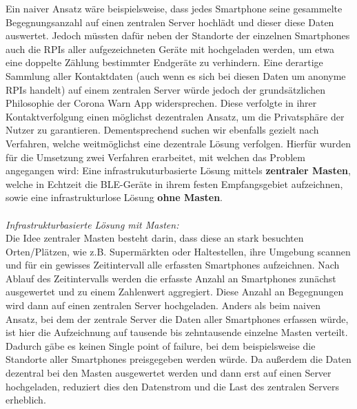 \documentclass[conference,compsoc]{IEEEtran}
\begin{document}
Ein naiver Ansatz wäre beispielsweise, dass jedes Smartphone seine gesammelte Begegnungsanzahl auf einen zentralen Server hochlädt und dieser diese Daten auswertet. 
Jedoch müssten dafür neben der Standorte der einzelnen Smartphones auch die RPIs aller aufgezeichneten Geräte mit hochgeladen werden, um etwa eine doppelte Zählung bestimmter Endgeräte zu verhindern. 
Eine derartige Sammlung aller Kontaktdaten (auch wenn es sich bei diesen Daten um anonyme RPIs handelt) auf einem zentralen Server würde jedoch der grundsätzlichen Philosophie der Corona Warn App widersprechen.
Diese verfolgte in ihrer Kontaktverfolgung einen möglichst dezentralen Ansatz, um die Privatsphäre der Nutzer zu garantieren.
Dementsprechend suchen wir ebenfalls gezielt nach Verfahren, welche weitmöglichst eine dezentrale Lösung verfolgen.
Hierfür wurden für die Umsetzung zwei Verfahren erarbeitet, mit welchen das Problem angegangen wird: Eine infrastrukuturbasierte Lösung mittels \textbf{zentraler Masten}, welche in Echtzeit die BLE-Geräte in ihrem festen Empfangsgebiet aufzeichnen, sowie eine infrastrukturlose Lösung \textbf{ohne Masten}. \\ \\
\textit{Infrastrukturbasierte Lösung mit Masten: }\\
Die Idee zentraler Masten besteht darin, dass diese an stark besuchten Orten/Plätzen, wie z.B. Supermärkten oder Haltestellen, ihre Umgebung scannen und für ein gewisses Zeitintervall alle erfassten Smartphones aufzeichnen. 
Nach Ablauf des Zeitintervalls werden die erfasste Anzahl an Smartphones zunächst ausgewertet und zu einem Zahlenwert aggregiert.
Diese Anzahl an Begegnungen wird dann auf einen zentralen Server hochgeladen.
Anders als beim naiven Ansatz, bei dem der zentrale Server die Daten aller Smartphones erfassen würde, ist hier die Aufzeichnung auf tausende bis zehntausende einzelne Masten verteilt. 
Dadurch gäbe es keinen \glqq Single point of failure\grqq, bei dem beispielsweise die Standorte aller Smartphones preisgegeben werden würde. 
Da außerdem die Daten dezentral bei den Masten ausgewertet werden und dann erst auf einen Server hochgeladen, reduziert dies den Datenstrom und die Last des zentralen Servers erheblich. 
\end{document}
